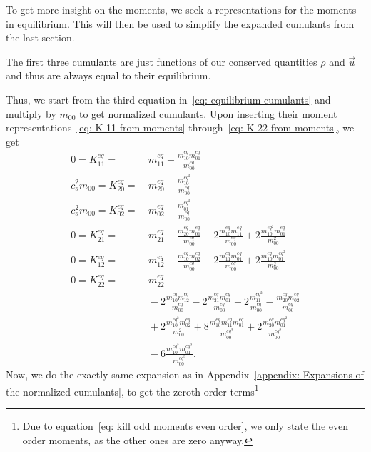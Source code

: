 
To get more insight on the moments, we seek a representations for the moments in equilibrium.
This will then be used to simplify the expanded cumulants from the last section.

The first three cumulants are just functions of our conserved quantities $\rho$ and $\vec{u}$ and thus are always equal to their equilibrium.

Thus, we start from the third equation in~\eqref{eq: equilibrium cumulants} and multiply by $m_{00}$ to get normalized cumulants.
Upon inserting their moment representations~\eqref{eq: K 11 from moments} through~\eqref{eq: K 22 from moments}, we get
\begin{equation}
  \begin{aligned}
    0 = K_{11}^{eq} = &\ m_{11}^{eq} - \frac{m_{10}^{eq}m_{01}^{eq}}{m_{00}^{eq}}
    \\
    c_s^2 m_{00} = K_{20}^{eq} = &\ m_{20}^{eq} - \frac{m_{10}^{{eq}^2}}{m_{00}^{eq}}
    \\
    c_s^2 m_{00} = K_{02}^{eq} = &\ m_{02}^{eq} - \frac{m_{01}^{{eq}^2}}{m_{00}^{eq}}
    \\
    0 = K_{21}^{eq} = &\ m_{21}^{eq} - \frac{m_{20}^{eq}m_{01}^{eq}}{m_{00}^{eq}} - 2\frac{m_{10}^{eq}m_{11}^{eq}} {m_{00}^{eq}} + 2\frac{m_{10}^{{eq}^2} m_{01}^{eq}}{m_{00}^2}
    \\
    0 = K_{12}^{eq} = &\ m_{12}^{eq} - \frac{m_{10}^{eq}m_{02}^{eq}}{m_{00}^{eq}}
    - 2\frac{m_{11}^{eq}m_{01}^{eq}}{m_{00}^{eq}} + 2\frac{m_{10}^{eq} m_{01}^{{eq}^2}}{m_{00}^2}
    \\
    0 = K_{22}^{eq} = &\ m_{22}^{eq}
    \\&\
    - 2 \frac{m_{10}^{eq}m_{12}^{eq}}{m_{00}^{eq}} - 2\frac{m_{21}^{eq}m_{01}^{eq}}{m_{00}^{eq}}
    - 2 \frac{m_{11}^{{eq}^2}}{m_{00}^{eq}} - \frac{m_{20}^{eq}m_{02}^{eq}}{m_{00}^{eq}}
    \\&\
    + 2 \frac{m_{10}^{{eq}^2} m_{02}^{eq}}{m_{00}^2} + 8 \frac{m_{10}^{eq}m_{11}^{eq}m_{01}^{eq}} {m_{00}^{{eq}^2}}
    + 2 \frac{m_{20}^{eq}m_{01}^{{eq}^2}}{m_{00}^{{eq}^2}}
    \\&\
    - 6 \frac{m_{10}^{{eq}^2} m_{01}^{{eq}^2}}{m_{00}^{{eq}^3}}.
  \end{aligned}
\end{equation}
Now, we do the exactly same expansion as in Appendix~\ref{appendix: Expansions of the normalized cumulants}, to get the zeroth order terms\footnote{Due to equation~\eqref{eq: kill odd moments even order}, we only state the even order moments, as the other ones are zero anyway.}
